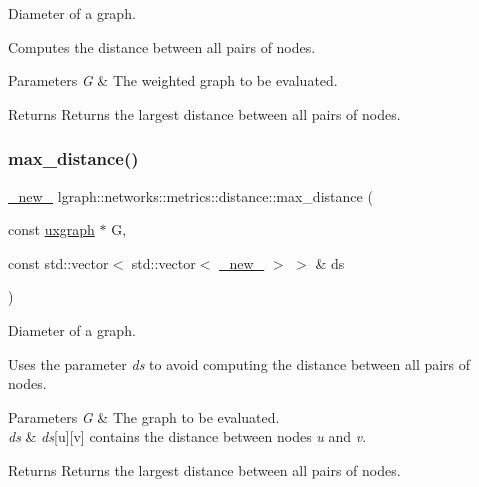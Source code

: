Diameter of a graph. 

Computes the distance between all pairs of nodes.


\begin{DoxyParams}{Parameters}
{\em G} & The weighted graph to be evaluated. \\
\hline
\end{DoxyParams}
\begin{DoxyReturn}{Returns}
Returns the largest distance between all pairs of nodes. 
\end{DoxyReturn}
\mbox{\label{namespacelgraph_1_1networks_1_1metrics_1_1distance_a26f8b017d849c3b2157aad7bc8e2aa84}} 
\subsubsection{\texorpdfstring{max\+\_\+distance()}{max\_distance()}\hspace{0.1cm}{\footnotesize\ttfamily [3/4]}}
{\footnotesize\ttfamily \hyperlink{namespacelgraph_a2836f966c1c36b43da337d8907728ec0}{\+\_\+new\+\_\+} lgraph\+::networks\+::metrics\+::distance\+::max\+\_\+distance (\begin{DoxyParamCaption}\item[{const \hyperlink{classlgraph_1_1uxgraph}{uxgraph} $\ast$}]{G,  }\item[{const std\+::vector$<$ std\+::vector$<$ \hyperlink{namespacelgraph_a2836f966c1c36b43da337d8907728ec0}{\+\_\+new\+\_\+} $>$ $>$ \&}]{ds }\end{DoxyParamCaption})}



Diameter of a graph. 

Uses the parameter {\itshape ds} to avoid computing the distance between all pairs of nodes.


\begin{DoxyParams}{Parameters}
{\em G} & The graph to be evaluated. \\
\hline
{\em ds} & {\itshape ds}\mbox{[}u\mbox{]}\mbox{[}v\mbox{]} contains the distance between nodes {\itshape u} and {\itshape v}. \\
\hline
\end{DoxyParams}
\begin{DoxyReturn}{Returns}
Returns the largest distance between all pairs of nodes. 
\end{DoxyReturn}
\mbox{\label{namespacelgraph_1_1networks_1_1metrics_1_1distance_ab8e7a10f4ecd1e1babf463b151027fa5}} 
